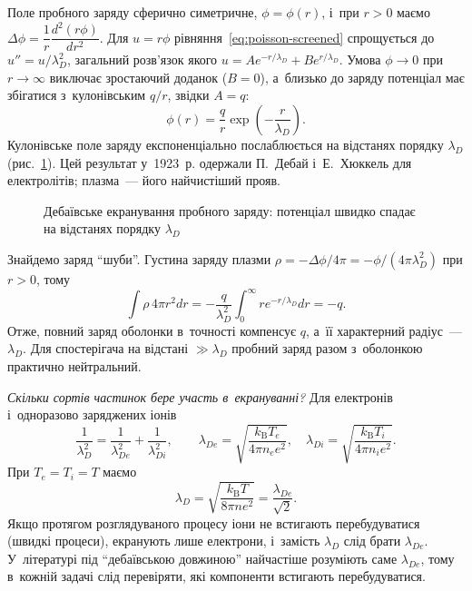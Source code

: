 Поле пробного заряду сферично симетричне, $\phi=\phi(r)$, і~при $r>0$ маємо
$\Delta\phi=\dfrac1r\dfrac{d^2(r\phi)}{dr^2}$. Для $u=r\phi$
рівняння~\eqref{eq:poisson-screened} спрощується до $u''=u/\lambda_D^2$, загальний
розв'язок якого $u=Ae^{-r/\lambda_D}+Be^{r/\lambda_D}$. Умова $\phi\to0$ при
$r\to\infty$ виключає зростаючий доданок ($B=0$), а~близько до заряду потенціал має
збігатися з~кулонівським $q/r$, звідки $A=q$:
\begin{equation}\label{eq:screened-potential}
	\phi(r)=\frac qr\exp\left(-\frac r{\lambda_D}\right).
\end{equation}
Кулонівське поле заряду експоненціально послаблюється на відстанях порядку $\lambda_D$
(рис.~\ref{pic:debye-screening}). Цей результат у~1923~р. одержали П.~Дебай і~Е.~Хюккель
для електролітів; плазма~--- його найчистіший прояв.

\begin{figure}[h!]\centering
	\caption{Дебаївське екранування пробного заряду: потенціал швидко спадає на відстанях
		порядку $\lambda_D$}
	\label{pic:debye-screening}
\end{figure}

Знайдемо заряд \enquote{шуби}. Густина заряду плазми
$\rho=-\Delta\phi/4\pi=-\phi/(4\pi\lambda_D^2)$ при $r>0$, тому
\begin{equation*}
	\int\rho\,4\pi r^2dr=-\frac q{\lambda_D^2}\int_0^\infty re^{-r/\lambda_D}dr=-q.
\end{equation*}
Отже, повний заряд оболонки в~точності компенсує $q$, а~її характерний радіус~---
$\lambda_D$. Для спостерігача на відстані $\gg\lambda_D$ пробний заряд разом з~оболонкою
практично нейтральний.

\emph{Скільки сортів частинок бере участь в~екрануванні?} Для електронів і~одноразово
заряджених іонів
\begin{equation*}
	\frac1{\lambda_D^2}=\frac1{\lambda_{De}^2}+\frac1{\lambda_{Di}^2},
	\qquad
	\lambda_{De}=\sqrt{\frac{k_{\mathrm B}T_e}{4\pi n_ee^2}},
	\quad
	\lambda_{Di}=\sqrt{\frac{k_{\mathrm B}T_i}{4\pi n_ie^2}}.
\end{equation*}
При $T_e=T_i=T$ маємо
\begin{equation}\label{eq:debye-radius}
	\lambda_D=\sqrt{\frac{k_{\mathrm B}T}{8\pi ne^2}}=\frac{\lambda_{De}}{\sqrt2}.
\end{equation}
Якщо протягом розглядуваного процесу іони не встигають перебудуватися (швидкі процеси),
екранують лише електрони, і~замість $\lambda_D$ слід брати $\lambda_{De}$. У~літературі
під \enquote{дебаївською довжиною} найчастіше розуміють саме $\lambda_{De}$, тому в~кожній
задачі слід перевіряти, які компоненти встигають перебудуватися.

